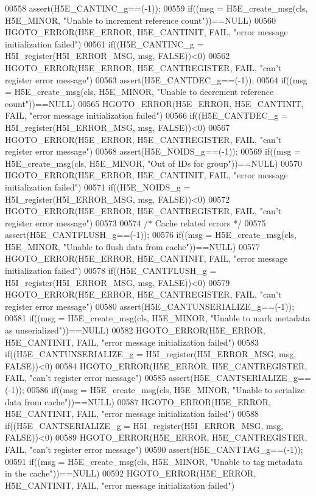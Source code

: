 \begin{DoxyCode}
00558 assert(H5E\_CANTINC\_g==(-1));
00559 if((msg = H5E\_create\_msg(cls, H5E\_MINOR, "Unable to increment reference count"))==NULL)
00560     HGOTO\_ERROR(H5E\_ERROR, H5E\_CANTINIT, FAIL, "error message initialization failed")
00561 if((H5E\_CANTINC\_g = H5I\_register(H5I\_ERROR\_MSG, msg, FALSE))<0)
00562     HGOTO\_ERROR(H5E\_ERROR, H5E\_CANTREGISTER, FAIL, "can't register error message")
00563 assert(H5E\_CANTDEC\_g==(-1));
00564 if((msg = H5E\_create\_msg(cls, H5E\_MINOR, "Unable to decrement reference count"))==NULL)
00565     HGOTO\_ERROR(H5E\_ERROR, H5E\_CANTINIT, FAIL, "error message initialization failed")
00566 if((H5E\_CANTDEC\_g = H5I\_register(H5I\_ERROR\_MSG, msg, FALSE))<0)
00567     HGOTO\_ERROR(H5E\_ERROR, H5E\_CANTREGISTER, FAIL, "can't register error message")
00568 assert(H5E\_NOIDS\_g==(-1));
00569 if((msg = H5E\_create\_msg(cls, H5E\_MINOR, "Out of IDs for group"))==NULL)
00570     HGOTO\_ERROR(H5E\_ERROR, H5E\_CANTINIT, FAIL, "error message initialization failed")
00571 if((H5E\_NOIDS\_g = H5I\_register(H5I\_ERROR\_MSG, msg, FALSE))<0)
00572     HGOTO\_ERROR(H5E\_ERROR, H5E\_CANTREGISTER, FAIL, "can't register error message")
00573 
00574 \textcolor{comment}{/* Cache related errors */}
00575 assert(H5E\_CANTFLUSH\_g==(-1));
00576 if((msg = H5E\_create\_msg(cls, H5E\_MINOR, "Unable to flush data from cache"))==NULL)
00577     HGOTO\_ERROR(H5E\_ERROR, H5E\_CANTINIT, FAIL, "error message initialization failed")
00578 if((H5E\_CANTFLUSH\_g = H5I\_register(H5I\_ERROR\_MSG, msg, FALSE))<0)
00579     HGOTO\_ERROR(H5E\_ERROR, H5E\_CANTREGISTER, FAIL, "can't register error message")
00580 assert(H5E\_CANTUNSERIALIZE\_g==(-1));
00581 if((msg = H5E\_create\_msg(cls, H5E\_MINOR, "Unable to mark metadata as unserialized"))==NULL)
00582     HGOTO\_ERROR(H5E\_ERROR, H5E\_CANTINIT, FAIL, "error message initialization failed")
00583 if((H5E\_CANTUNSERIALIZE\_g = H5I\_register(H5I\_ERROR\_MSG, msg, FALSE))<0)
00584     HGOTO\_ERROR(H5E\_ERROR, H5E\_CANTREGISTER, FAIL, "can't register error message")
00585 assert(H5E\_CANTSERIALIZE\_g==(-1));
00586 if((msg = H5E\_create\_msg(cls, H5E\_MINOR, "Unable to serialize data from cache"))==NULL)
00587     HGOTO\_ERROR(H5E\_ERROR, H5E\_CANTINIT, FAIL, "error message initialization failed")
00588 if((H5E\_CANTSERIALIZE\_g = H5I\_register(H5I\_ERROR\_MSG, msg, FALSE))<0)
00589     HGOTO\_ERROR(H5E\_ERROR, H5E\_CANTREGISTER, FAIL, "can't register error message")
00590 assert(H5E\_CANTTAG\_g==(-1));
00591 if((msg = H5E\_create\_msg(cls, H5E\_MINOR, "Unable to tag metadata in the cache"))==NULL)
00592     HGOTO\_ERROR(H5E\_ERROR, H5E\_CANTINIT, FAIL, "error message initialization failed")

\end{DoxyCode}
